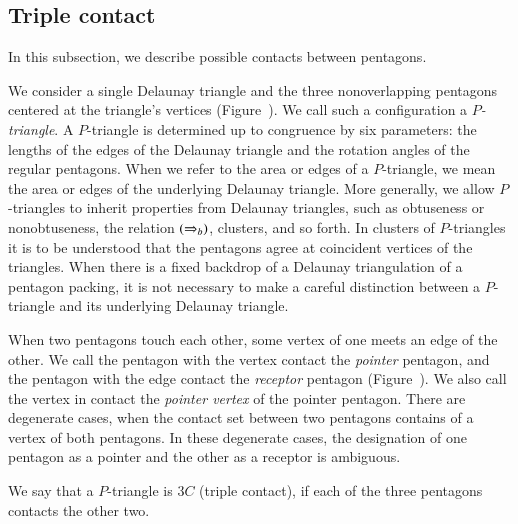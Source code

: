 \subsection{Triple contact}

In this subsection, we describe possible contacts between pentagons.

We consider a single Delaunay triangle and the three nonoverlapping
pentagons centered at the triangle's vertices
(Figure~).  We call such a configuration a {\it
  $P$-triangle}.  A $P$-triangle is determined up to congruence by six
parameters: the lengths of the edges of the Delaunay triangle and the
rotation angles of the regular pentagons.  When we refer to the area
or edges of a $P$-triangle, we mean the area or edges of the
underlying Delaunay triangle.  More generally, we allow $P$-triangles
to inherit properties from Delaunay triangles, such as obtuseness or
nonobtuseness, the relation $(\Rightarrow_{b})$, clusters, and so forth. In
clusters of $P$-triangles it is to be understood that the pentagons
agree at coincident vertices of the triangles.  When there is a
fixed backdrop of a Delaunay triangulation of a pentagon packing, it
is not necessary to make a careful distinction between a $P$-triangle
and its underlying Delaunay triangle.


When two pentagons touch each other, some vertex of one meets an edge
of the other.  We call the pentagon with the vertex contact the {\it
  pointer} pentagon, and the pentagon with the edge contact the {\it
  receptor} pentagon (Figure~).  We also call the
vertex in contact the {\it pointer vertex} of the pointer
pentagon. There are degenerate cases, when the contact set between two
pentagons contains of a vertex of both pentagons.  In these degenerate
cases, the designation of one pentagon as a pointer and the other as a
receptor is ambiguous.




We say that a $P$-triangle is $3C$ (triple contact),
if each of the three pentagons contacts the other two.

